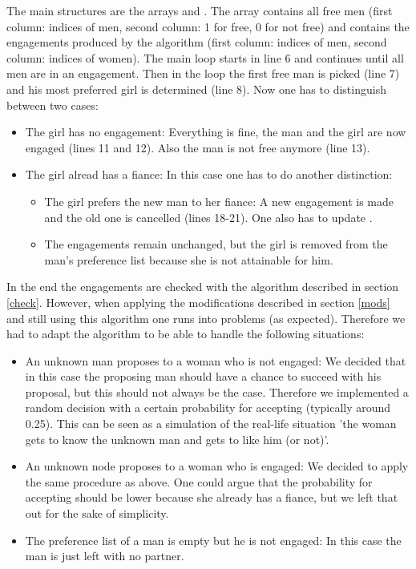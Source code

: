 \documentclass[11pt]{article}
\begin{document}


The main structures are the arrays  and . The array  contains all free men (first column: indices of
men, second column: 1 for free, 0 for not free) and  contains the engagements produced by the algorithm (first column: indices of men, 
second column: indices of women). The main loop starts in line 6 and continues until all men are in an engagement. Then in the loop
the first free man is picked (line 7) and his most preferred girl is determined (line 8). Now one has to distinguish between two cases:

\begin{itemize}
  \item The girl has no engagement: Everything is fine, the man and the girl are now engaged (lines 11 and 12). Also the man is not free
  anymore (line 13).
  \item The girl alread has a fiance: In this case one has to do another distinction:
  \begin{itemize}
    \item The girl prefers the new man to her fiance: A new engagement is made and the old one is cancelled (lines 18-21).
    One also has to update .
    \item The engagements remain unchanged, but the girl is removed from the man's preference list because she is not attainable for him.
  \end{itemize}
\end{itemize}

In the end the engagements are checked with the  algorithm described in section \ref{check}. However, when applying the
modifications described in section \ref{mods} and still using this algorithm one runs into problems (as expected). Therefore we had to adapt
the  algorithm to be able to handle the following situations:

\begin{itemize}
  \item An unknown man proposes to a woman who is not engaged: We decided that in this case the proposing man should have a chance to succeed
  with his proposal, but this should not always be the case. Therefore we implemented a random decision with a certain probability for accepting
  (typically around 0.25). This can be seen as a simulation of the real-life situation 'the woman gets to know the unknown man
  and gets to like him (or not)'.
  \item An unknown node proposes to a woman who is engaged: We decided to apply the same procedure as above. One could argue that the probability
  for accepting should be lower because she already has a fiance, but we left that out for the sake of simplicity.
  \item The preference list of a man is empty but he is not engaged: In this case the man is just left with no partner.
\end{itemize}
\end{document}
